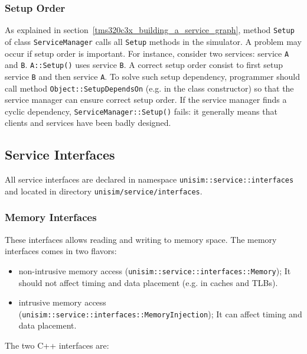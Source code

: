 \subsubsection{Setup Order}

As explained in section~\ref{tms320c3x_building_a_service_graph}, method \texttt{Setup} of class \texttt{ServiceManager} calls all \texttt{Setup} methods in the simulator. 
A problem may occur if setup order is important.
For instance, consider two services: service \texttt{A} and \texttt{B}. 
\texttt{A::Setup()} uses service \texttt{B}.
A correct setup order consist to first setup service \texttt{B} and then service \texttt{A}.
To solve such setup dependency, programmer should call method \texttt{Object::SetupDependsOn} (e.g. in the class constructor) so that the service manager can ensure correct setup order.
If the service manager finds a cyclic dependency, \texttt{ServiceManager::Setup()} fails: it generally means that clients and services have been badly designed.

\newpage
\subsection{Service Interfaces}
\label{tms320c3x_interfaces}

All service interfaces are declared in namespace \texttt{unisim::service::interfaces} and located in directory \texttt{unisim/service/interfaces}.

\subsubsection{Memory Interfaces}

These interfaces allows reading and writing to memory space. The memory interfaces comes in two flavors:
\begin{itemize}
\item non-intrusive memory access (\texttt{unisim::service::interfaces::Memory}); It should not affect timing and data placement (e.g. in caches and TLBs).
\item intrusive memory access (\texttt{unisim::service::interfaces::MemoryInjection}); It can affect timing and data placement.
\end{itemize}

\noindent The two C++ interfaces are:

\begin{center}
	
\end{center}

